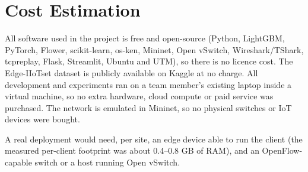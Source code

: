 \section{Cost Estimation}
All software used in the project is free and open-source (Python, LightGBM, PyTorch, Flower, scikit-learn, os-ken, Mininet, Open vSwitch, Wireshark/TShark, tcpreplay, Flask, Streamlit, Ubuntu and UTM), so there is no licence cost. The Edge-IIoTset dataset is publicly available on Kaggle at no charge. All development and experiments ran on a team member's existing laptop inside a virtual machine, so no extra hardware, cloud compute or paid service was purchased. The network is emulated in Mininet, so no physical switches or IoT devices were bought.

A real deployment would need, per site, an edge device able to run the client (the measured per-client footprint was about 0.4--0.8 GB of RAM), and an OpenFlow-capable switch or a host running Open vSwitch.
